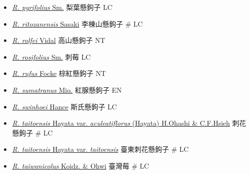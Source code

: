 \begin{itemize}
\begin{itemize}
        \item[] \href{http://www.theplantlist.org/tpl1.1/search?q=Rubus+pyrifolius}{\textit{R. pyrifolius} Sm.}   梨葉懸鉤子   LC
        \item[] \href{http://www.theplantlist.org/tpl1.1/search?q=Rubus+ritozanensis}{\textit{R. ritozanensis} Sasaki}   李棟山懸鉤子  \# LC
        \item[] \href{http://www.theplantlist.org/tpl1.1/search?q=Rubus+rolfei}{\textit{R. rolfei} Vidal}   高山懸鉤子   NT
        \item[] \href{http://www.theplantlist.org/tpl1.1/search?q=Rubus+rosifolius}{\textit{R. rosifolius} Sm.}   刺莓   LC
        \item[] \href{http://www.theplantlist.org/tpl1.1/search?q=Rubus+rufus}{\textit{R. rufus} Focke}   棕紅懸鉤子   NT
        \item[] \href{http://www.theplantlist.org/tpl1.1/search?q=Rubus+sumatranus}{\textit{R. sumatranus} Miq.}   紅腺懸鉤子   EN
        \item[] \href{http://www.theplantlist.org/tpl1.1/search?q=Rubus+swinhoei}{\textit{R. swinhoei} Hance}   斯氏懸鉤子   LC
        \item[] \href{http://www.theplantlist.org/tpl1.1/search?q=Rubus+taitoensis+var.+aculeatiflorus}{\textit{R. taitoensis} Hayata var. \textit{aculeatiflorus} (Hayata) H.Ohashi \& C.F.Hsieh}   刺花懸鉤子  \# LC
        \item[] \href{http://www.theplantlist.org/tpl1.1/search?q=Rubus+taitoensis+var.+taitoensis}{\textit{R. taitoensis} Hayata var. \textit{taitoensis}}   臺東刺花懸鉤子  \# LC
        \item[] \href{http://www.theplantlist.org/tpl1.1/search?q=Rubus+taiwanicolus}{\textit{R. taiwanicolus} Koidz. \& Ohwi}   臺灣莓  \# LC

\end{itemize}
\end{itemize}
